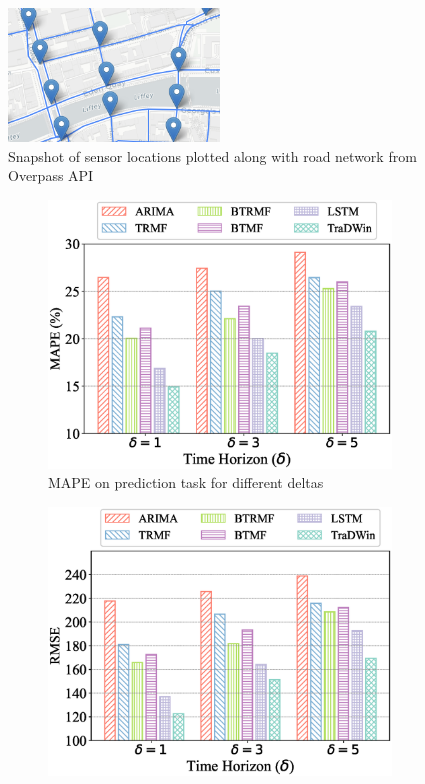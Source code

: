 \begin{figure}[t]
  \centering
  \includegraphics[width=0.5\textwidth]{dataset.png}
  \caption{Snapshot of sensor locations plotted along with road network from Overpass API}
  \label{fig:dataset}
\end{figure}
\begin{figure}[]
  \centering
  \begin{subfigure}[b]{0.4\textwidth}
      \centering
      \includegraphics[width=\textwidth]{mape_pred.eps}
      \caption{MAPE on prediction task for different deltas}
      \label{fig:mape_pred}
  \end{subfigure}
  \begin{subfigure}[b]{0.4\textwidth}
      \centering
      \includegraphics[width=\textwidth]{rmse_pred.eps}

\end{subfigure}
\end{figure}

